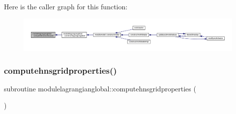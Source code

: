 Here is the caller graph for this function\+:\nopagebreak
\begin{figure}[H]
\begin{center}
\leavevmode
\includegraphics[width=350pt]{namespacemodulelagrangianglobal_ae26f6cb369947b236a6e8dffcbed3eb2_icgraph}
\end{center}
\end{figure}
\mbox{\label{namespacemodulelagrangianglobal_a9448f83b93f06396188a1d8aac9725f8}} 
\subsubsection{\texorpdfstring{computehnsgridproperties()}{computehnsgridproperties()}}
{\footnotesize\ttfamily subroutine modulelagrangianglobal\+::computehnsgridproperties (\begin{DoxyParamCaption}{ }\end{DoxyParamCaption})\hspace{0.3cm}{\ttfamily [private]}}

